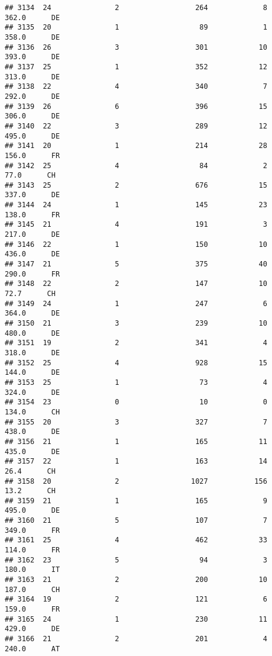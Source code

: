 \documentclass[
]{article}
\begin{document}
\begin{verbatim}
## 3134  24               2                  264             8    362.0      DE
## 3135  20               1                   89             1    358.0      DE
## 3136  26               3                  301            10    393.0      DE
## 3137  25               1                  352            12    313.0      DE
## 3138  22               4                  340             7    292.0      DE
## 3139  26               6                  396            15    306.0      DE
## 3140  22               3                  289            12    495.0      DE
## 3141  20               1                  214            28    156.0      FR
## 3142  25               4                   84             2     77.0      CH
## 3143  25               2                  676            15    337.0      DE
## 3144  24               1                  145            23    138.0      FR
## 3145  21               4                  191             3    217.0      DE
## 3146  22               1                  150            10    436.0      DE
## 3147  21               5                  375            40    290.0      FR
## 3148  22               2                  147            10     72.7      CH
## 3149  24               1                  247             6    364.0      DE
## 3150  21               3                  239            10    480.0      DE
## 3151  19               2                  341             4    318.0      DE
## 3152  25               4                  928            15    144.0      DE
## 3153  25               1                   73             4    324.0      DE
## 3154  23               0                   10             0    134.0      CH
## 3155  20               3                  327             7    438.0      DE
## 3156  21               1                  165            11    435.0      DE
## 3157  22               1                  163            14     26.4      CH
## 3158  20               2                 1027           156     13.2      CH
## 3159  21               1                  165             9    495.0      DE
## 3160  21               5                  107             7    349.0      FR
## 3161  25               4                  462            33    114.0      FR
## 3162  23               5                   94             3    180.0      IT
## 3163  21               2                  200            10    187.0      CH
## 3164  19               2                  121             6    159.0      FR
## 3165  24               1                  230            11    429.0      DE
## 3166  21               2                  201             4    240.0      AT

\end{verbatim}
\end{document}
